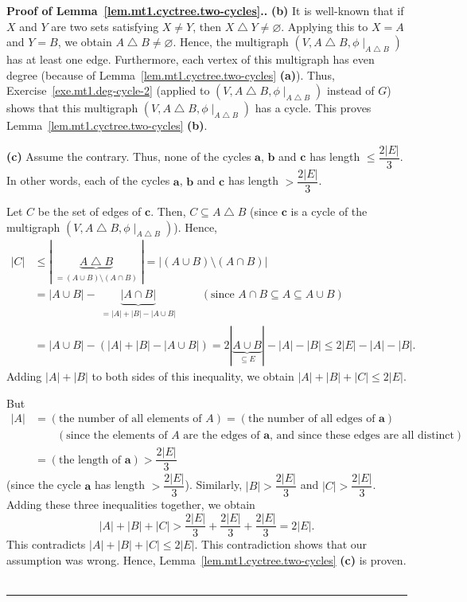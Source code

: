 \documentclass[numbers=enddot,12pt,final,onecolumn,notitlepage]{scrartcl}%
\theoremstyle{definition}
\newenvironment{proof}[1][Proof]{\noindent\textbf{#1.} }{\ \rule{0.5em}{0.5em}}
\newcommand{\abs}[1]{\left| #1 \right|}
\newcommand{\tup}[1]{\left( #1 \right)}
\newcommand{\underbrack}[2]{\underbrace{#1}_{\substack{#2}}}
\begin{document}
\begin{proof}[Proof of Lemma~\ref{lem.mt1.cyctree.two-cycles}.]
\textbf{(b)} It is well-known that if $X$ and $Y$ are two sets
satisfying $X \neq Y$, then $X \bigtriangleup Y \neq \varnothing$.
Applying this to $X = A$ and $Y = B$, we obtain
$A \bigtriangleup B \neq \varnothing$. Hence, the multigraph
$\tup{V, A \bigtriangleup B, \phi\mid_{A \bigtriangleup B}}$ has at
least one edge. Furthermore, each vertex of this multigraph has even
degree (because of
Lemma~\ref{lem.mt1.cyctree.two-cycles} \textbf{(a)}). Thus,
Exercise~\ref{exe.mt1.deg-cycle-2} (applied to
$\tup{V, A \bigtriangleup B, \phi\mid_{A \bigtriangleup B}}$ instead
of $G$) shows that this multigraph
$\tup{V, A \bigtriangleup B, \phi\mid_{A \bigtriangleup B}}$ has a
cycle.
This proves Lemma~\ref{lem.mt1.cyctree.two-cycles} \textbf{(b)}.

\textbf{(c)} Assume the contrary.
Thus, none of the cycles $\mathbf{a}$, $\mathbf{b}$ and
$\mathbf{c}$ has length $\leq \dfrac{2 \abs{E}}{3}$. In other words, each
of the cycles $\mathbf{a}$, $\mathbf{b}$ and
$\mathbf{c}$ has length $> \dfrac{2 \abs{E}}{3}$.

Let $C$ be the set of edges of $\mathbf{c}$. Then,
$C \subseteq A \bigtriangleup B$ (since $\mathbf{c}$ is a cycle
of the multigraph
$\tup{V, A \bigtriangleup B, \phi\mid_{A \bigtriangleup B}}$). Hence,
\begin{align*}
\abs{C}
&\leq \abs{\underbrack{A \bigtriangleup B}
                      {= \tup{A \cup B} \setminus \tup{A \cap B}}}
= \abs{\tup{A \cup B} \setminus \tup{A \cap B}} \\
&= \abs{A \cup B} - \underbrack{\abs{A \cap B}}
                              {= \abs{A} + \abs{B} - \abs{A \cup B}}
\qquad
\left(\text{since } A \cap B \subseteq A \subseteq A \cup B \right) \\
&= \abs{A \cup B} - \tup{\abs{A} + \abs{B} - \abs{A \cup B}}
= 2 \abs{\underbrace{A \cup B}_{\subseteq E}} - \abs{A} - \abs{B}
\leq 2 \abs{E} - \abs{A} - \abs{B} .
\end{align*}
Adding $\abs{A} + \abs{B}$ to both sides of this inequality, we obtain
$\abs{A} + \abs{B} + \abs{C} \leq 2 \abs{E}$.

But
\begin{align*}
\abs{A}
&=
\tup{\text{the number of all elements of } A }
=
\tup{\text{the number of all edges of } \mathbf{a}} \\
& \qquad
\left(\text{since the elements of } A \text{ are the edges of }
        \mathbf{a}\text{, and since these edges are all distinct}
\right) \\
&= \tup{\text{the length of } \mathbf{a}}
> \dfrac{2 \abs{E}}{3}
\end{align*}
(since the cycle $\mathbf{a}$ has length $> \dfrac{2 \abs{E}}{3}$).
Similarly, $\abs{B} > \dfrac{2 \abs{E}}{3}$ and
$\abs{C} > \dfrac{2 \abs{E}}{3}$. Adding these three inequalities
together, we obtain
\[
\abs{A} + \abs{B} + \abs{C}
> \dfrac{2 \abs{E}}{3} + \dfrac{2 \abs{E}}{3}
        + \dfrac{2 \abs{E}}{3}
= 2 \abs{E} .
\]
This contradicts $\abs{A} + \abs{B} + \abs{C} \leq 2 \abs{E}$.
This contradiction shows that our assumption was wrong. Hence,
Lemma~\ref{lem.mt1.cyctree.two-cycles} \textbf{(c)} is proven.
\end{proof}
\end{document}
